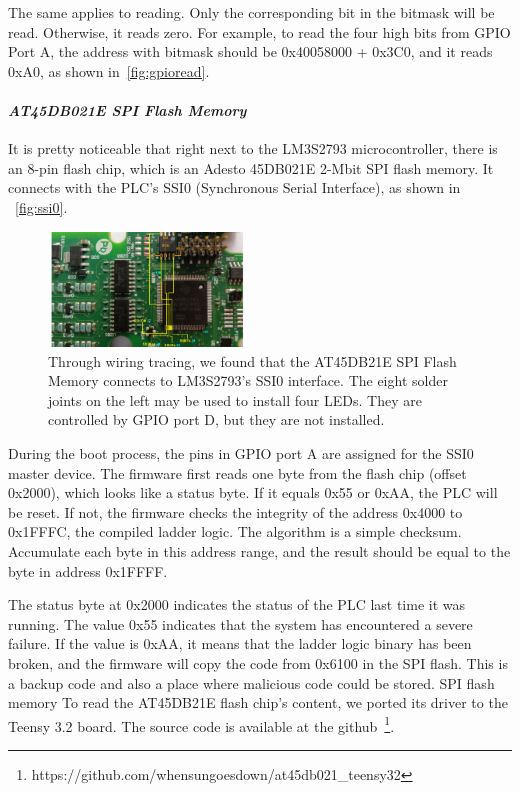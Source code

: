 The same applies to reading. Only the corresponding bit in the bitmask will be read. Otherwise, it reads zero. For example, to read the four high bits from GPIO Port A, the address with bitmask should be 0x40058000 + 0x3C0, and it reads 0xA0, as shown in~\autoref{fig:gpioread}.


\paragraph{\textbf{\textit{AT45DB021E SPI Flash Memory}}}  It is pretty noticeable that right next to the LM3S2793 microcontroller,  there is an 8-pin flash chip, which is an Adesto 45DB021E 2-Mbit SPI flash memory. It connects with the PLC's SSI0 (Synchronous Serial Interface), as shown in ~\autoref{fig:ssi0}.

\begin{figure}[tp!]
	\includegraphics[width=0.47\textwidth]{figures/ssi0}
	\centering
	\caption{Through wiring tracing, we found that the AT45DB21E SPI Flash Memory connects to LM3S2793's SSI0 interface. The eight solder joints on the left may be used to install four LEDs. They are controlled by GPIO port D,  but they are not installed.}
	\label{fig:ssi0}
\end{figure}


During the boot process, the pins in GPIO port A are assigned for the SSI0 master device. The firmware first reads one byte from the flash chip (offset 0x2000), which looks like a status byte. If it equals 0x55 or 0xAA, the PLC will be reset. If not, the firmware checks the integrity of the address 0x4000 to 0x1FFFC, the compiled ladder logic. The algorithm is a simple checksum. Accumulate each byte in this address range, and the result should be equal to the byte in address 0x1FFFF.

The status byte at 0x2000 indicates the status of the PLC last time it was running. The value 0x55 indicates that the system has encountered a severe failure. %
If the value is 0xAA, it means that the ladder logic binary has been broken, and the firmware will copy the code from 0x6100 in the SPI flash. This is a backup code and also a place where malicious code could be stored. SPI flash memory
To read the AT45DB21E flash chip's content, we ported its driver to the Teensy 3.2 board. The source code is available at the github~\footnote{https://github.com/whensungoesdown/at45db021\_teensy32}.

